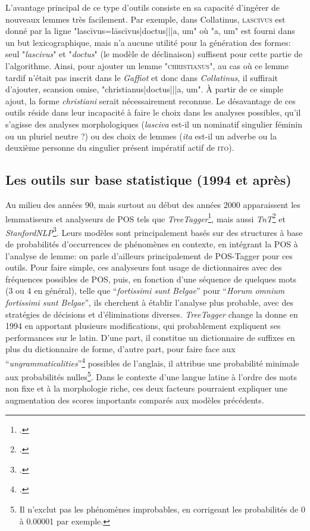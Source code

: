 L'avantage principal de ce type d'outils consiste en sa capacité d'ingérer de nouveaux lemmes très facilement. Par exemple, dans Collatinus, \textsc{lascivus} est donné par la ligne "lascīvus=lāscīvus|doctus|||a, um" où "a, um" est fourni dans un but lexicographique, mais n'a aucune utilité pour la génération des formes: seul "\textit{lascivus}" et "\textit{doctus}" (le modèle de déclinaison) suffisent pour cette partie de l'algorithme. Ainsi, pour ajouter un lemme "\textsc{christianus}", au cas où ce lemme tardif n'était pas inscrit dans le \textit{Gaffiot} et donc dans \textit{Collatinus}, il suffirait d'ajouter, scansion omise, "christianus|doctus|||a, um". À partir de ce simple ajout, la forme \textit{christiani} serait nécessairement reconnue. Le désavantage de ces outils réside dans leur incapacité à faire le choix dans les analyses possibles, qu'il s'agisse des analyses morphologiques (\textit{lasciva} est-il un nominatif singulier féminin ou un pluriel neutre ?) ou des choix de lemmes (\textit{ita} est-il un adverbe ou la deuxième personne du singulier présent impératif actif de \textsc{ito}).

\subsection{Les outils sur base statistique (1994 et après)}

Au milieu des années 90, mais surtout au début des années 2000 apparaissent les lemmatiseurs et analyseurs de POS tels que \textit{TreeTagger}\footcite{schmid1994treetagger}, mais aussi \textit{TnT}\footcite{brants_tnt_2000} et \textit{StanfordNLP}\footcite{toutanova_feature-rich_2003}. Leurs modèles sont principalement basés sur des structures à base de probabilités d'occurrences de phénomènes en contexte, en intégrant la POS à l'analyse de lemme: on parle d'ailleurs principalement de POS-Tagger pour ces outils. Pour faire simple, ces analyseurs font usage de dictionnaires avec des fréquences possibles de POS, puis, en fonction d'une séquence de quelques mots (3 ou 4 en général), telle que \enquote{\textit{fortissimi sunt Belgae}} pour \enquote{\textit{Horum omnium fortissimi sunt Belgae}}, ils cherchent à établir l'analyse plus probable, avec des stratégies de décisions et d'éliminations diverses. \textit{TreeTagger} change la donne en 1994 en apportant plusieurs modifications, qui probablement expliquent ses performances sur le latin. D'une part, il constitue un dictionnaire de suffixes en plus du dictionnaire de forme, d'autre part, pour faire face aux \enquote{\textit{ungrammaticalities}}\footcite[p.~2]{schmid1994treetagger} possibles de l'anglais, il attribue une probabilité minimale aux probabilités nulles\footnote{Il n'exclut pas les phénomènes improbables, en corrigeant les probabilités de 0 à 0.00001 par exemple.}. Dans le contexte d'une langue latine à l'ordre des mots non fixe et à la morphologie riche, ces deux facteurs pourraient expliquer une augmentation des scores importants comparés aux modèles précédents.

